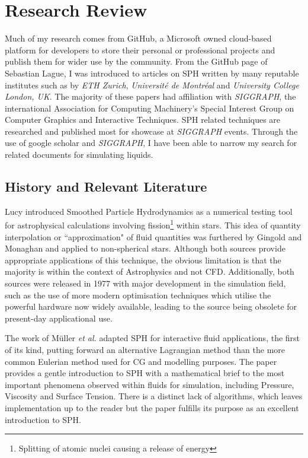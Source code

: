 \documentclass[write-up.tex]{subfiles}
\begin{document}
\section{Research Review}
Much of my research comes from GitHub, a Microsoft owned cloud-based platform for developers to store their personal or professional projects and publish them for wider use by the community. From the GitHub page of Sebastian Lague, I was introduced to articles on SPH written by many reputable institutes such as by \textit{ETH Zurich}, \textit{Université de Montréal} and \textit{University College London, UK}. The majority of these papers had affiliation with \textit{SIGGRAPH}, the international Association for Computing Machinery's Special Interest Group on Computer Graphics and Interactive Techniques. SPH related techniques are researched and published most for showcase at \textit{SIGGRAPH} events. Through the use of google scholar and \textit{SIGGRAPH}, I have been able to narrow my search for related documents for simulating liquids.
\subsection{History and Relevant Literature}
Lucy \cite{lucy} introduced Smoothed Particle Hydrodynamics as a numerical testing tool for astrophysical calculations involving fission\footnote{Splitting of atomic nuclei causing a release of energy} within stars. This idea of quantity interpolation or ``approximation" of fluid quantities was furthered by Gingold and Monaghan \cite{gingold} and applied to non-spherical stars. Although both sources provide appropriate applications of this technique, the obvious limitation is that the majority is within the context of Astrophysics and not CFD. Additionally, both sources were released in 1977 with major development in the simulation field, such as the use of more modern optimisation techniques which utilise the powerful hardware now widely available, leading to the source being obsolete for present-day applicational use.

The work of Müller \textit{et al.} \cite{muller} adapted SPH for interactive fluid applications, the first of its kind, putting forward an alternative Lagrangian method than the more common Eulerian method used for CG and modelling purposes. The paper provides a gentle introduction to SPH with a mathematical brief to the most important phenomena observed within fluids for simulation, including Pressure, Viscosity and Surface Tension. There is a distinct lack of algorithms, which leaves implementation up to the reader but the paper fulfills its purpose as an excellent introduction to SPH.
\end{document}
